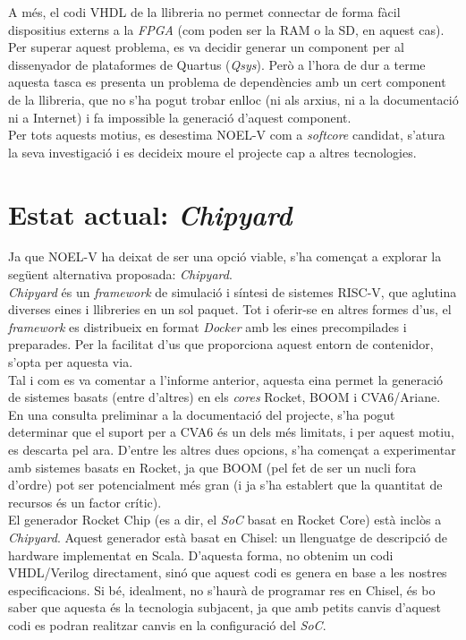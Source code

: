 \documentclass{article}
\begin{document}
A més, el codi VHDL de la llibreria no permet connectar de forma fàcil dispositius externs a la \textit{FPGA} (com poden ser la RAM o la SD, en aquest cas). Per superar aquest problema, es va decidir generar un component per al dissenyador de plataformes de Quartus (\textit{Qsys}). Però a l'hora de dur a terme aquesta tasca es presenta un problema de dependències amb un cert component de la llibreria, que no s'ha pogut trobar enlloc (ni als arxius, ni a la documentació ni a Internet) i fa impossible la generació d'aquest component.\\

Per tots aquests motius, es desestima NOEL-V com a \textit{softcore} candidat, s'atura la seva investigació i es decideix moure el projecte cap a altres tecnologies.

\section{Estat actual: \textit{Chipyard}}

Ja que NOEL-V ha deixat de ser una opció viable, s'ha començat a explorar la següent alternativa proposada: \textit{Chipyard}.\\

\textit{Chipyard} és un \textit{framework} de simulació i síntesi de sistemes RISC-V, que aglutina diverses eines i llibreries en un sol paquet. Tot i oferir-se en altres formes d'us, el \textit{framework} es distribueix en format \textit{Docker} amb les eines precompilades i preparades. Per la facilitat d'us que proporciona aquest entorn de contenidor, s'opta per aquesta via.\\

Tal i com es va comentar a l'informe anterior, aquesta eina permet la generació de sistemes basats (entre d'altres) en els \textit{cores} Rocket, BOOM i CVA6/Ariane. En una consulta preliminar a la documentació del projecte, s'ha pogut determinar que el suport per a CVA6 és un dels més limitats, i per aquest motiu, es descarta pel ara. D'entre les altres dues opcions, s'ha començat a experimentar amb sistemes basats en Rocket, ja que BOOM (pel fet de ser un nucli fora d'ordre) pot ser potencialment més gran (i ja s'ha establert que la quantitat de recursos és un factor crític).\\

El generador Rocket Chip (es a dir, el \textit{SoC} basat en Rocket Core) està inclòs a \textit{Chipyard}. Aquest generador està basat en Chisel: un llenguatge de descripció de hardware implementat en Scala. D'aquesta forma, no obtenim un codi VHDL/Verilog directament, sinó que aquest codi es genera en base a les nostres especificacions. Si bé, idealment, no s'haurà de programar res en Chisel, és bo saber que aquesta és la tecnologia subjacent, ja que amb petits canvis d'aquest codi es podran realitzar canvis en la configuració del \textit{SoC}.\\
\end{document}
